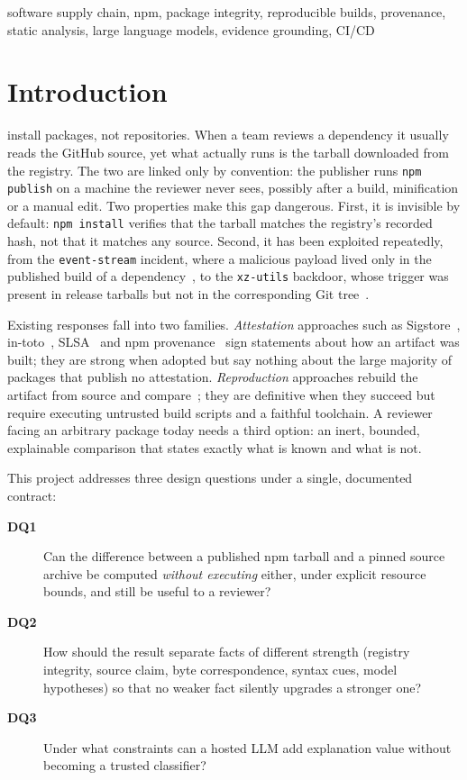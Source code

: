\documentclass[conference]{IEEEtran}
\newcommand{\code}[1]{\texttt{#1}}
\begin{document}
\begin{IEEEkeywords}
software supply chain, npm, package integrity, reproducible builds, provenance,
static analysis, large language models, evidence grounding, CI/CD
\end{IEEEkeywords}

\section{Introduction}

 install packages, not repositories. When a team
reviews a dependency it usually reads the GitHub source, yet what actually runs
is the tarball downloaded from the registry. The two are linked only by
convention: the publisher runs \code{npm publish} on a machine the reviewer
never sees, possibly after a build, minification or a manual edit. Two
properties make this gap dangerous. First, it is invisible by default:
\code{npm install} verifies that the tarball matches the registry's recorded
hash, not that it matches any source. Second, it has been exploited repeatedly,
from the \code{event-stream} incident, where a malicious payload lived only in
the published build of a dependency~\cite{eventstream}, to the \code{xz-utils}
backdoor, whose trigger was present in release tarballs but not in the
corresponding Git tree~\cite{xz}.

Existing responses fall into two families. \emph{Attestation} approaches such
as Sigstore~\cite{sigstore}, in-toto~\cite{intoto}, SLSA~\cite{slsa} and npm
provenance~\cite{npmprov} sign statements about how an artifact was built; they
are strong when adopted but say nothing about the large majority of packages
that publish no attestation. \emph{Reproduction} approaches rebuild the artifact
from source and compare~\cite{lamb2021}; they are definitive when they succeed
but require executing untrusted build scripts and a faithful toolchain. A
reviewer facing an arbitrary package today needs a third option: an inert,
bounded, explainable comparison that states exactly what is known and what is
not.

This project addresses three design questions under a single, documented
contract:
\begin{description}
\item[\textbf{DQ1}] Can the difference between a published npm tarball and a
pinned source archive be computed \emph{without executing} either, under explicit
resource bounds, and still be useful to a reviewer?
\item[\textbf{DQ2}] How should the result separate facts of different strength
(registry integrity, source claim, byte correspondence, syntax cues, model
hypotheses) so that no weaker fact silently upgrades a stronger one?
\item[\textbf{DQ3}] Under what constraints can a hosted LLM add explanation
value without becoming a trusted classifier?
\end{description}
\end{document}
